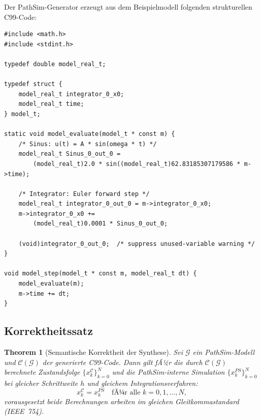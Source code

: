 ﻿\documentclass[12pt,a4paper]{article}
\newtheorem{theorem}{Theorem}[section]
\theoremstyle{definition}
\begin{document}
Der PathSim-Generator erzeugt aus dem Beispielmodell folgenden strukturellen C99-Code:

\begin{lstlisting}[style=cstyle, caption={Generierter MISRA-konformer C99-Code (vereinfacht)}]
#include <math.h>
#include <stdint.h>

typedef double model_real_t;

typedef struct {
    model_real_t integrator_0_x0;
    model_real_t time;
} model_t;

static void model_evaluate(model_t * const m) {
    /* Sinus: u(t) = A * sin(omega * t) */
    model_real_t Sinus_0_out_0 =
        (model_real_t)2.0 * sin((model_real_t)62.83185307179586 * m->time);

    /* Integrator: Euler forward step */
    model_real_t integrator_0_out_0 = m->integrator_0_x0;
    m->integrator_0_x0 +=
        (model_real_t)0.0001 * Sinus_0_out_0;

    (void)integrator_0_out_0;  /* suppress unused-variable warning */
}

void model_step(model_t * const m, model_real_t dt) {
    model_evaluate(m);
    m->time += dt;
}
\end{lstlisting}

\subsection{Korrektheitssatz}

\begin{theorem}[Semantische Korrektheit der Synthese]
\label{thm:correct}
Sei $\mathcal{G}$ ein PathSim-Modell und $\mathcal{C}(\mathcal{G})$ der
generierte C99-Code. Dann gilt fÃ¼r die durch $\mathcal{C}(\mathcal{G})$
berechnete Zustandsfolge $\{x_k^\mathcal{C}\}_{k=0}^N$ und die PathSim-interne
Simulation $\{x_k^{PS}\}_{k=0}^N$ bei gleicher Schrittweite $h$ und gleichem
Integrationsverfahren:
\[
  x_k^\mathcal{C} = x_k^{PS} \quad \text{fÃ¼r alle } k = 0, 1, \ldots, N,
\]
vorausgesetzt beide Berechnungen arbeiten im gleichen Gleitkommastandard (IEEE~754).
\end{theorem}
\end{document}
